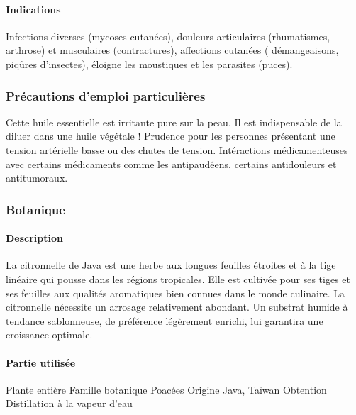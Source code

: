 \documentclass[12pt,a4wide]{article}
\begin{document}
\paragraph{Indications}
\label{sec-4-5-1-3}
Infections diverses (mycoses cutanées), douleurs articulaires (rhumatismes, arthrose) et musculaires (contractures), affections cutanées ( démangeaisons, piqûres d'insectes), éloigne les moustiques et les parasites (puces).

\subsubsection{Précautions d'emploi particulières}
\label{sec-4-5-2}
Cette huile essentielle est irritante pure sur la peau. Il est indispensable de la diluer dans une huile végétale !
Prudence pour les personnes présentant une tension artérielle basse ou des chutes de tension.
Intéractions médicamenteuses avec certains médicaments comme les antipaudéens, certains antidouleurs et antitumoraux.

\subsubsection{Botanique}
\label{sec-4-5-3}


\paragraph{Description}
\label{sec-4-5-3-1}
La citronnelle de Java est une herbe aux longues feuilles étroites et à la tige linéaire qui pousse dans les régions tropicales. Elle est cultivée pour ses tiges et ses feuilles aux qualités aromatiques bien connues dans le monde culinaire. La citronnelle nécessite un arrosage relativement abondant. Un substrat humide à tendance sablonneuse, de préférence légèrement enrichi, lui garantira une croissance optimale.

\paragraph{Partie utilisée}
\label{sec-4-5-3-2}
Plante entière
Famille botanique
Poacées
Origine
Java, Taïwan
Obtention
Distillation à la vapeur d'eau
\end{document}
